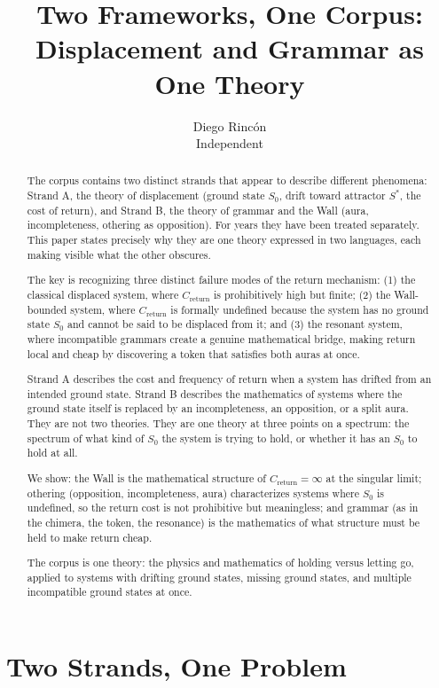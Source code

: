\documentclass[12pt]{article}
\title{Two Frameworks, One Corpus:\\
Displacement and Grammar as One Theory}
\author{Diego Rincón\\
\small Independent}
\date{}
\theoremstyle{definition}
\theoremstyle{remark}
\begin{document}
\maketitle

\begin{abstract}
The corpus contains two distinct strands that appear to describe different phenomena: Strand A, the theory of displacement (ground state $S_0$, drift toward attractor $S^*$, the cost of return), and Strand B, the theory of grammar and the Wall (aura, incompleteness, othering as opposition).
For years they have been treated separately. This paper states precisely why they are one theory expressed in two languages, each making visible what the other obscures.

The key is recognizing three distinct failure modes of the return mechanism: (1) the classical displaced system, where $C_{\text{return}}$ is prohibitively high but finite; (2) the Wall-bounded system, where $C_{\text{return}}$ is formally undefined because the system has no ground state $S_0$ and cannot be said to be displaced from it; and (3) the resonant system, where incompatible grammars create a genuine mathematical bridge, making return local and cheap by discovering a token that satisfies both auras at once.

Strand A describes the cost and frequency of return when a system has drifted from an intended ground state. Strand B describes the mathematics of systems where the ground state itself is replaced by an incompleteness, an opposition, or a split aura. They are not two theories. They are one theory at three points on a spectrum: the spectrum of what kind of $S_0$ the system is trying to hold, or whether it has an $S_0$ to hold at all.

We show: the Wall is the mathematical structure of $C_{\text{return}}=\infty$ at the singular limit; othering (opposition, incompleteness, aura) characterizes systems where $S_0$ is undefined, so the return cost is not prohibitive but meaningless; and grammar (as in the chimera, the token, the resonance) is the mathematics of what structure must be held to make return cheap.

The corpus is one theory: the physics and mathematics of holding versus letting go, applied to systems with drifting ground states, missing ground states, and multiple incompatible ground states at once.
\end{abstract}

\section{Two Strands, One Problem}
\end{document}
